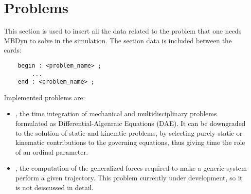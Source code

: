 %
%
%
%
%
% 
%
%

\chapter{Problems}\label{sec:PROBLEMS}
This section is used to insert all the data related to the problem that
one needs MBDyn to solve in the simulation.
The section data is included between the cards:
\begin{verbatim}
    begin : <problem_name> ;
        ...
    end : <problem_name> ;
\end{verbatim}

Implemented problems are:
\begin{itemize}
\item {}, the time integration of mechanical
and multidisciplinary problems formulated
as Differential-Algenraic Equations (DAE).
It can be downgraded to the solution of static and kinemtic problems,
by selecting purely static or kinematic contributions
to the governing equations, thus giving time the role
of an ordinal parameter.

\item {}, the computation of the generalized forces
required to make a generic system perform a given trajectory.
This problem currently under development, so it is not deiscussed
in detail.

\end{itemize}






